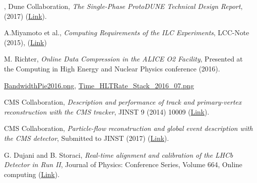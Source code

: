 \documentclass[11pt,letterpaper,fleqn]{article}
\begin{document}
\begin{thebibliography}{99}
, 
Dune Collaboration, 
\textit{The Single-Phase ProtoDUNE Technical Design Report},
(2017) (\href{https://arxiv.org/abs/1706.07081}{Link}). 

A.Miyamoto et al., 
\textit{Computing Requirements of the ILC Experiments}, 
LCC-Note (2015), (\href{http://www-jlc.kek.jp/~miyamoto/SoftwareCommonTask/docs/ILCComputing-EDMS1130485.A.1.1.pdf}{Link})

M. Richter, 
\textit{Online Data Compression in the ALICE O2 Facility}, 
Presented at the Computing in High Energy and Nuclear Physics conference (2016).

\href{https://twiki.cern.ch/twiki/pub/AtlasPublic/TriggerOperationPublicResults/BandwidthPie2016.png}{BandwidthPie2016.png}, 
\href{https://twiki.cern.ch/twiki/pub/AtlasPublic/TriggerOperationPublicResults/Time_HLTRate_Stack_2016_07.png}{Time\_HLTRate\_Stack\_2016\_07.png}

CMS Collaboration, 
\textit{Description and performance of track and primary-vertex reconstruction with the CMS tracker},  
JINST 9 (2014) 10009 (\href{http://cds.cern.ch/record/1704291}{Link}). 

CMS Collaboration, 
\textit{Particle-flow reconstruction and global event description with the CMS detector}, 
Submitted to JINST (2017) (\href{https://arxiv.org/abs/1706.04965}{Link}).

G. Dujani and B. Storaci, 
\textit{Real-time alignment and calibration of the LHCb Detector in Run II}, 
Journal of Physics: Conference Series, Volume 664, Online computing (\href{https://cds.cern.ch/record/2017839?ln=en}{Link}).

 










\end{thebibliography}


\end{document}
